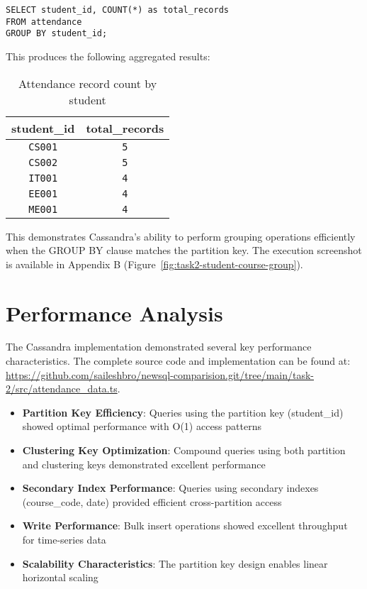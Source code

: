 \begin{verbatim}
SELECT student_id, COUNT(*) as total_records
FROM attendance
GROUP BY student_id;
\end{verbatim}

This produces the following aggregated results:

\begin{table}[H]
  \centering
  \begin{tabular}{|c|c|}
    \hline
    \textbf{student\_id} & \textbf{total\_records} \\
    \hline
    \texttt{CS001}                & \texttt{5}                       \\
    \texttt{CS002}                & \texttt{5}                       \\
    \texttt{IT001}                & \texttt{4}                       \\
    \texttt{EE001}                & \texttt{4}                       \\
    \texttt{ME001}                & \texttt{4}                       \\
    \hline
  \end{tabular}
  \caption{Attendance record count by student}
\end{table}

This demonstrates Cassandra's ability to perform grouping operations efficiently when the GROUP BY clause matches the partition key. The execution screenshot is available in Appendix B (Figure~\ref{fig:task2-student-course-group}).

\section{Performance Analysis}

The Cassandra implementation demonstrated several key performance characteristics. The complete source code and implementation can be found at: \url{https://github.com/saileshbro/newsql-comparision.git/tree/main/task-2/src/attendance_data.ts}.

\begin{itemize}
    \item \textbf{Partition Key Efficiency}: Queries using the partition key (student\_id) showed optimal performance with O(1) access patterns
    \item \textbf{Clustering Key Optimization}: Compound queries using both partition and clustering keys demonstrated excellent performance
    \item \textbf{Secondary Index Performance}: Queries using secondary indexes (course\_code, date) provided efficient cross-partition access
    \item \textbf{Write Performance}: Bulk insert operations showed excellent throughput for time-series data
    \item \textbf{Scalability Characteristics}: The partition key design enables linear horizontal scaling
\end{itemize}

